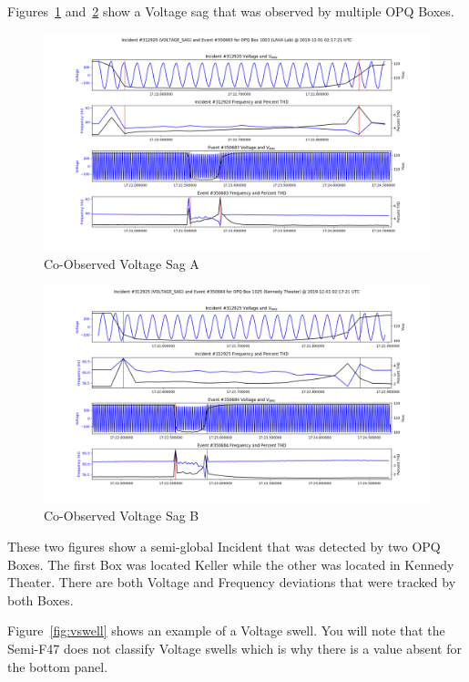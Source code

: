 Figures~\ref{fig:vsag_1} and~\ref{fig:vsag_2} show a Voltage sag that was observed by multiple OPQ Boxes.

\begin{figure}[H]
    \centering
    \includegraphics[width=\linewidth]{figures/vsag_1.png}
    \caption{Co-Observed Voltage Sag A}
    \label{fig:vsag_1}
\end{figure}

\begin{figure}[H]
    \centering
    \includegraphics[width=\linewidth]{figures/vsag_2.png}
    \caption{Co-Observed Voltage Sag B}
    \label{fig:vsag_2}
\end{figure}

These two figures show a semi-global Incident that was detected by two OPQ Boxes. The first Box was located Keller while the other was located in Kennedy Theater. There are both Voltage and Frequency deviations that were tracked by both Boxes.

Figure~\ref{fig:vswell} shows an example of a Voltage swell. You will note that the Semi-F47 does not classify Voltage swells which is why there is a value absent for the bottom panel.

